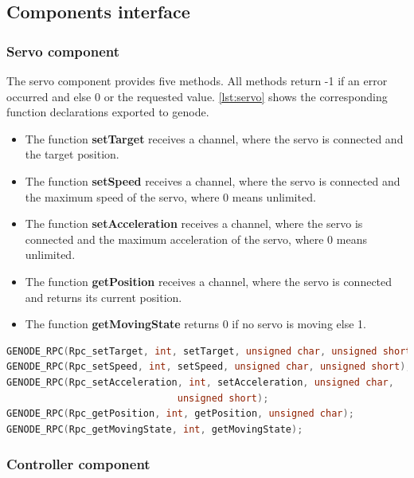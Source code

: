 \subsection{Components interface}
\label{sec:comp}


\subsubsection{Servo component}
\label{sec:comp-servo}

The servo component provides five methods. All methods return -1 if an error occurred and else 0 or the requested value.
\autoref{lst:servo} shows the corresponding function declarations exported to genode.
\begin{itemize}
\item The function \textbf{setTarget} receives a channel, where the servo is connected and the target position.
\item The function \textbf{setSpeed} receives a channel, where the servo is connected and the maximum speed of the servo, where 0 means unlimited.
\item The function \textbf{setAcceleration} receives a channel, where the servo is connected and the maximum acceleration of the servo, where 0 means unlimited.
\item The function \textbf{getPosition} receives a channel, where the servo is connected and returns its current position.
\item The function \textbf{getMovingState} returns 0 if no servo is moving else 1.
\end{itemize}

\begin{lstlisting}[language=c, frame=single, basicstyle=\footnotesize,  label={lst:servo}, caption=Genode interface for servo component]
GENODE_RPC(Rpc_setTarget, int, setTarget, unsigned char, unsigned short);
GENODE_RPC(Rpc_setSpeed, int, setSpeed, unsigned char, unsigned short);
GENODE_RPC(Rpc_setAcceleration, int, setAcceleration, unsigned char, 
						      unsigned short);
GENODE_RPC(Rpc_getPosition, int, getPosition, unsigned char);
GENODE_RPC(Rpc_getMovingState, int, getMovingState);
\end{lstlisting}

\subsubsection{Controller component}
\label{sec:comp-controller}

